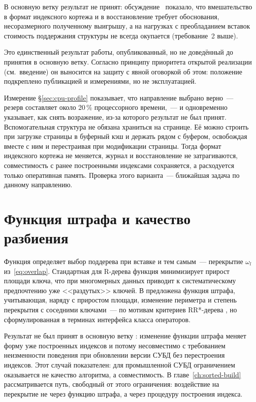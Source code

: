 В основную ветку \pg{} результат не принят: обсуждение~\cite{thread-intrapage}
показало, что вмешательство в формат индексного кортежа и в восстановление
требует обоснования, несоразмерного полученному выигрышу, а на нагрузках с
преобладанием вставок стоимость поддержания структуры не всегда окупается
(требование~2 выше).

Это единственный результат работы, опубликованный, но не доведённый до
принятия в основную ветку. Согласно принципу приоритета открытой реализации
(см.~введение) он выносится на защиту с явной оговоркой об этом: положение
подкреплено публикацией и измерениями, но не эксплуатацией.

Измерение §\ref{sec:cpu-profile} показывает, что направление выбрано верно~---
резерв составляет около 20\,\% процессорного времени,~--- и одновременно
указывает, как снять возражение, из-за которого результат не был принят.
Вспомогательная структура не обязана храниться на странице. Её можно строить
при загрузке страницы в буферный кэш и держать рядом с буфером, освобождая
вместе с ним и перестраивая при модификации страницы. Тогда формат индексного
кортежа не меняется, журнал и восстановление не затрагиваются, совместимость с
ранее построенными индексами сохраняется, а расходуется только оперативная
память. Проверка этого варианта~--- ближайшая задача по данному направлению.

\section{Функция штрафа и качество разбиения}
\label{sec:penalty}

Функция  определяет выбор поддерева при вставке и тем самым~---
перекрытие $\omega_l$ из~\eqref{eq:overlap}. Стандартная для R-дерева функция
минимизирует прирост площади ключа, что при многомерных данных приводит к
систематическому предпочтению уже <<раздутых>> ключей. В
\cite{borodin2017penalty} предложена функция штрафа, учитывающая, наряду с
приростом площади, изменение периметра и степень перекрытия с соседними
ключами~--- по мотивам критериев RR*-дерева \cite{beckmann2009rrstar}, но
сформулированная в терминах интерфейса класса операторов.

Результат не был принят в основную ветку \pg{}: изменение функции штрафа меняет
форму уже построенных индексов и потому несовместимо с требованием
неизменности поведения при обновлении версии СУБД без перестроения индексов.
Этот случай показателен: для промышленной СУБД ограничением оказывается не
качество алгоритма, а совместимость. В главе~\ref{ch:sorted-build}
рассматривается путь, свободный от этого ограничения: воздействие на перекрытие
не через функцию штрафа, а через процедуру построения индекса.

